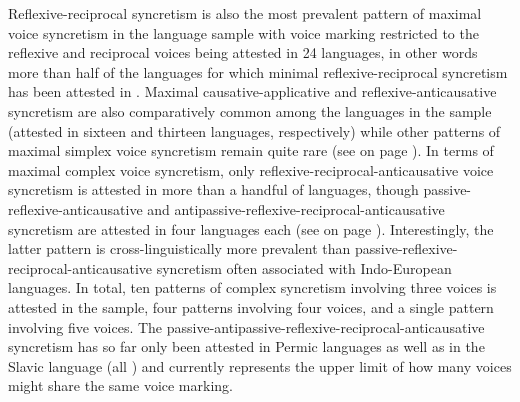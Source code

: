 Reflexive-reciprocal syncretism is also the most prevalent pattern of maximal voice syncretism in the language sample with voice marking restricted to the reflexive and reciprocal voices being attested in 24 languages, in other words more than half of the languages for which minimal reflexive-reciprocal syncretism has been attested in . Maximal causative-applicative and reflexive-anti\-cau\-sa\-tive syncretism are also comparatively common among the languages in the sample (attested in sixteen and thirteen languages, respectively) while other patterns of maximal simplex voice syncretism remain quite rare (see  on page \pageref{tab:ch6:voice-syncretism-maximal-simplex-macroarea}). In terms of maximal complex voice syncretism, only reflexive-reciprocal-anticausative voice syncretism is attested in more than a handful of languages, though passive-reflexive-anticausative and anti\-pas\-sive-re\-flex\-ive-re\-ci\-pro\-cal-anti\-cau\-sa\-tive syncretism are attested in four languages each (see  on page \pageref{tab:ch6:voice-syncretism-maximal-complex-macroarea}). Interestingly, the latter pattern is cross-linguistically more prevalent than passive-reflexive-reciprocal-anticausative syncretism often associated with Indo-European languages. In total, ten patterns of complex syncretism involving three voices is attested in the sample, four patterns involving four voices, and a single pattern involving five voices. The passive-antipassive-reflexive-reciprocal-anticausative syncretism has so far only been attested in Permic languages as well as in the Slavic language  (all ) and currently represents the upper limit of how many voices might share the same voice marking. 
